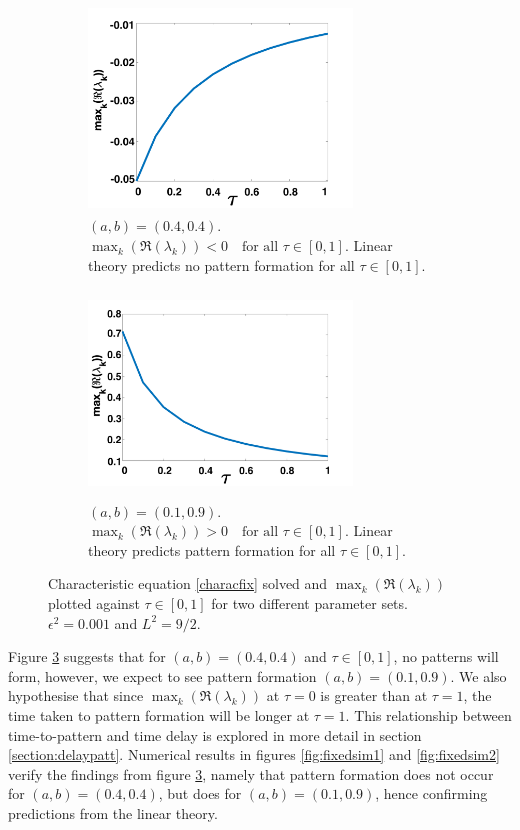 \begin{figure}[H]
    \centering
    \begin{subfigure}[t]{0.45\textwidth}
        \centering
        \includegraphics[width=7cm,height = 5.5cm]{disp1.png}
        \caption{$(a,b)=(0.4,0.4)$. $\max_k(\Re(\lambda_k))<0 \quad \text{for all }\tau\in[0,1]$. Linear theory predicts no pattern formation for all $\tau\in[0,1]$. }
        \label{}
    \end{subfigure}
    \hfill
    \begin{subfigure}[t]{0.45\textwidth}
        \centering
        \includegraphics[width=7cm,height = 5.5cm]{disp2.png}
        \caption{$(a,b)=(0.1,0.9)$. $\max_k(\Re(\lambda_k))>0 \quad \text{for all }\tau\in[0,1]$. Linear theory predicts pattern formation for all $\tau\in[0, 1]$.}
        \label{}
    \end{subfigure}
    \caption{Characteristic equation \eqref{characfix} solved and $\max_k(\Re(\lambda_k))$ plotted against $\tau\in[0,1]$ for two different parameter sets. $\epsilon^2=0.001$ and $L^2=9/2$.}
    \label{fig:dispfixed}
\end{figure}
Figure \ref{fig:dispfixed} suggests that for $(a,b)=(0.4,0.4)$ and $\tau\in[0,1]$, no patterns will form, however, we expect to see pattern formation $(a,b)=(0.1,0.9)$. We also hypothesise that since $\max_k(\Re(\lambda_k))$ at $\tau=0$ is greater than at $\tau=1$, the time taken to pattern formation will be longer at $\tau=1$. This relationship between time-to-pattern and time delay is explored in more detail in section \ref{section:delaypatt}. Numerical results in figures \ref{fig:fixedsim1} and \ref{fig:fixedsim2} verify the findings from figure \ref{fig:dispfixed}, namely that pattern formation does not occur for $(a,b)=(0.4,0.4)$, but does for $(a,b)=(0.1,0.9)$, hence confirming predictions from the linear theory.

